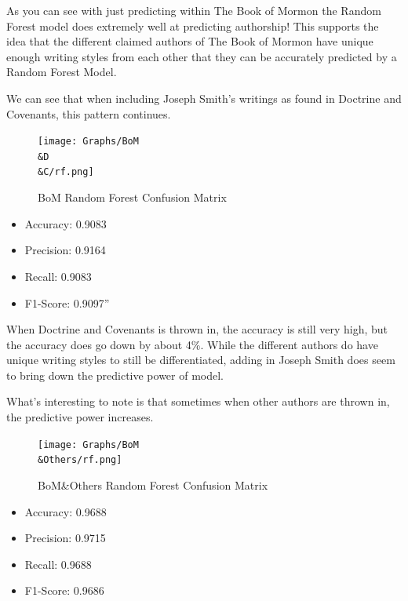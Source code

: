 \documentclass[
  letterpaper,
  DIV=11,
  numbers=noendperiod]{scrartcl}
\providecommand{\tightlist}{%
  \setlength{\itemsep}{0pt}\setlength{\parskip}{0pt}}\usepackage{longtable,booktabs,array}
\begin{document}
As you can see with just predicting within The Book of Mormon the Random
Forest model does extremely well at predicting authorship! This supports
the idea that the different claimed authors of The Book of Mormon have
unique enough writing styles from each other that they can be accurately
predicted by a Random Forest Model.

We can see that when including Joseph Smith's writings as found in
Doctrine and Covenants, this pattern continues.

\begin{figure}

{\centering \texttt{[image: Graphs/BoM\\\&D\\\&C/rf.png]}

}

\caption{BoM Random Forest Confusion Matrix}

\end{figure}

\begin{itemize}
\tightlist
\item
  Accuracy: 0.9083
\item
  Precision: 0.9164
\item
  Recall: 0.9083
\item
  F1-Score: 0.9097''
\end{itemize}

When Doctrine and Covenants is thrown in, the accuracy is still very
high, but the accuracy does go down by about 4\%. While the different
authors do have unique writing styles to still be differentiated, adding
in Joseph Smith does seem to bring down the predictive power of model.

What's interesting to note is that sometimes when other authors are
thrown in, the predictive power increases.

\begin{figure}

{\centering \texttt{[image: Graphs/BoM\\\&Others/rf.png]}

}

\caption{BoM\&Others Random Forest Confusion Matrix}

\end{figure}

\begin{itemize}
\tightlist
\item
  Accuracy: 0.9688
\item
  Precision: 0.9715
\item
  Recall: 0.9688
\item
  F1-Score: 0.9686
\end{itemize}
\end{document}

